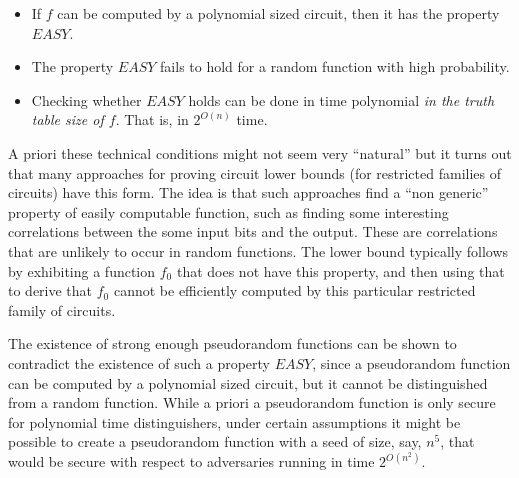 \begin{itemize}
\item
  If \(f\) can be computed by a polynomial sized circuit, then it has
  the property \(\ensuremath{\mathit{EASY}}\).
\item
  The property \(\ensuremath{\mathit{EASY}}\) fails to hold for a random
  function with high probability.
\item
  Checking whether \(\ensuremath{\mathit{EASY}}\) holds can be done in
  time polynomial \emph{in the truth table size of \(f\)}. That is, in
  \(2^{O(n)}\) time.
\end{itemize}

A priori these technical conditions might not seem very ``natural'' but
it turns out that many approaches for proving circuit lower bounds (for
restricted families of circuits) have this form. The idea is that such
approaches find a ``non generic'' property of easily computable
function, such as finding some interesting correlations between the some
input bits and the output. These are correlations that are unlikely to
occur in random functions. The lower bound typically follows by
exhibiting a function \(f_0\) that does not have this property, and then
using that to derive that \(f_0\) cannot be efficiently computed by this
particular restricted family of circuits.

The existence of strong enough pseudorandom functions can be shown to
contradict the existence of such a property
\(\ensuremath{\mathit{EASY}}\), since a pseudorandom function can be
computed by a polynomial sized circuit, but it cannot be distinguished
from a random function. While a priori a pseudorandom function is only
secure for polynomial time distinguishers, under certain assumptions it
might be possible to create a pseudorandom function with a seed of size,
say, \(n^5\), that would be secure with respect to adversaries running
in time \(2^{O(n^2)}\).
